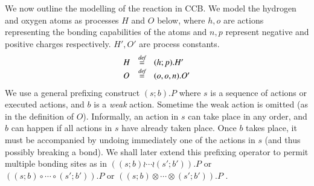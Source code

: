 \documentclass[review]{elsarticle}
\newcommand{\bydef}{\stackrel{\emph{def}}{=}}
\begin{document}
We now outline the modelling of the reaction in CCB.  %
We model the hydrogen and oxygen atoms as processes $H$ and $O$ below, where 
$h,o$ are actions representing the bonding capabilities of the atoms and $n,p$ 
represent negative and positive charges respectively. $H',O'$ are process constants.
$$\begin{array}{lll}
H & \bydef & (h;p).H'\\
O & \bydef & (o,o,n).O'
\end{array}$$
We use a general prefixing construct $(s;b).P$ where $s$ is a sequence of actions or executed 
actions, and $b$ is a \emph{weak} action. Sometime the weak action is omitted 
(as in the definition of $O$). Informally, an action in $s$ can take place in any order, 
and $b$ can happen if
all actions in $s$ have already taken place. Once $b$ takes place, it must be accompanied by
undoing immediately one of the actions in $s$ (and thus possibly breaking a bond). We shall later extend
this prefixing operator to permit multiple bonding sites as in $((s;b)\wr \cdots\wr (s';b')).P$
or  $((s;b)\circ \cdots\circ (s';b')).P$ or  $((s;b)\otimes \cdots\otimes (s';b')).P$ .
\end{document}
